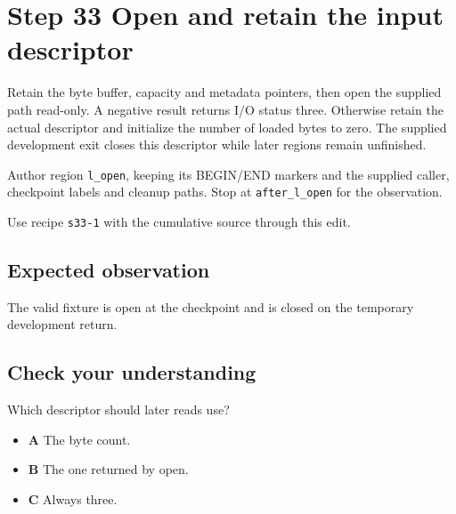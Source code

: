 \section{Step 33 Open and retain the input descriptor}\label{ppm-s33}

Retain the byte buffer, capacity and metadata pointers, then open the supplied path read-only. A negative result returns I/O status three. Otherwise retain the actual descriptor and initialize the number of loaded bytes to zero. The supplied development exit closes this descriptor while later regions remain unfinished.

Author region \texttt{l\_open}, keeping its BEGIN/END markers and the supplied caller, checkpoint labels and cleanup paths. Stop at \texttt{after\_l\_open} for the observation.

Use recipe \texttt{s33-1} with the cumulative source through this edit.

\subsection{Expected observation}
The valid fixture is open at the checkpoint and is closed on the temporary development return.

\subsection{Check your understanding}
Which descriptor should later reads use?

\begin{itemize}
\item \textbf{A} The byte count.
\item \textbf{B} The one returned by open.
\item \textbf{C} Always three.
\end{itemize}
